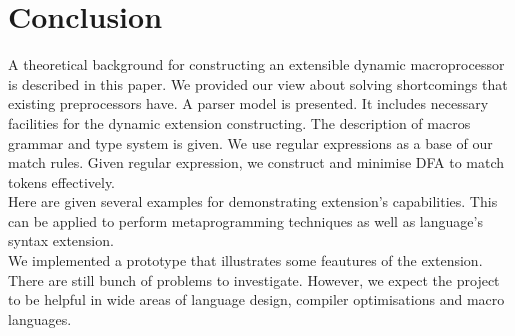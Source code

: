 \section{Conclusion}
A theoretical background for constructing an extensible dynamic macroprocessor
is described in this paper. We provided our view about solving shortcomings
that existing preprocessors have. A parser model is presented. It includes
necessary facilities for the dynamic extension constructing. The description of
macros grammar and type system is given. We use regular expressions as a base
of our match rules. Given regular expression, we construct and minimise DFA to
match tokens effectively. \\
Here are given several examples for demonstrating extension's capabilities.
This can be applied to perform metaprogramming techniques as well as language's
syntax extension. \\
We implemented a prototype that illustrates some feautures of the extension.
There are still bunch of problems to investigate. However, we expect the
project to be helpful in wide areas of language design, compiler optimisations
and macro languages.
